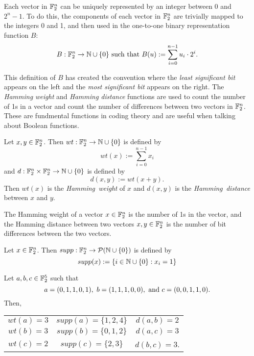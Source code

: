\par Each vector in $\mathbb{F}_2^n$ can be uniquely represented by an integer
between $0$ and $2^n-1$. To do this, the components of each vector in
$\mathbb{F}_2^n$ are trivially mapped to the integers 0 and 1, and then used in
the one-to-one binary representation function $B$:
\begin{equation}
	B:\gftwo^n\rightarrow\nnn\cup\{0\}\ \allowbreak
  {\rm such\ that }\ \allowbreak B(u) := \sum_{i=0}^{n-1}u_i\cdot2^i.
\end{equation}

\par This definition of $B$ has created the convention where the
{\em least significant bit} appears on the left and the 
{\em most significant bit} appears on the right. The {\it Hamming weight}
and {\it Hamming distance} functions are used to count the number of 1s in a
vector and count the number of differences between two vectors in
$\mathbb{F}_2^n$. These are fundmental functions in coding theory and are useful
when talking about Boolean functions.

\begin{definition}\label{def:Hamming}
	Let $x,y\in\mathbb{F}_2^n$. Then $wt:\mathbb{F}_2^n\rightarrow\mathbb{N}\cup\{0\}$
  is defined by
	\[
	  wt(x):=\sum_{i=0}^{n-1}x_i
	\]
	and $d:\mathbb{F}_2^n\times\mathbb{F}_2^n\rightarrow\mathbb{N}\cup\{0\}$ is defined by
	\[
	  d(x,y):=wt(x+y).
	\]
	Then $wt(x)$ is the {\em Hamming\ weight} of $x$ and $d(x,y)$ is the
	{\em Hamming\ distance} between $x$ and $y$.
\end{definition}

\begin{remark}
	The Hamming weight of a vector $x\in\mathbb{F}_2^n$ is the number of 1s in the
  vector, and the Hamming distance between two vectors $x,y\in\mathbb{F}_2^n$ is
  the number of bit differences between the two vectors.
\end{remark}

\begin{definition}
\label{def:support}
	Let $x\in\mathbb{F}_2^n$. Then $supp:\mathbb{F}_2^n\rightarrow\allowbreak
  \mathcal{P}(\mathbb{N}\cup\{0\})$ is defined by
	\[
		supp(x):=\{i\in\mathbb{N}\cup\{0\}:x_i=1\}
	\]
\end{definition}

\begin{example}
	Let $a,b,c\in\mathbb{F}_2^5$ such that
	\[
	a=(0,1,1,0,1),\ b=(1,1,1,0,0),\ {\rm and}\ c=(0,0,1,1,0).
	\]
	Then,
	\begin{center}
		\begin{tabular}{c c c}
			$wt(a)=3$&$supp(a)=\{1,2,4\}$&$d(a,b)=2$\\
			$wt(b)=3$&$supp(b)=\{0,1,2\}$&$d(a,c)=3$\\
			$wt(c)=2$&$ supp(c)=\{2,3\}$ &$d(b,c)=3$.\\
		\end{tabular}
	\end{center}
\end{example}

